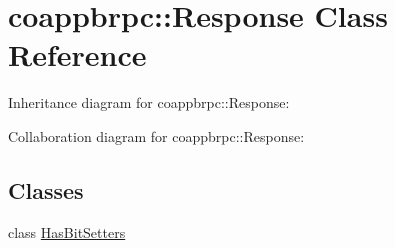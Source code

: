 \hypertarget{classcoappbrpc_1_1Response}{}\section{coappbrpc\+:\+:Response Class Reference}
\label{classcoappbrpc_1_1Response}


Inheritance diagram for coappbrpc\+:\+:Response\+:


Collaboration diagram for coappbrpc\+:\+:Response\+:
\subsection*{Classes}
\begin{DoxyCompactItemize}
\item 
class \hyperlink{classcoappbrpc_1_1Response_1_1HasBitSetters}{Has\+Bit\+Setters}
\end{DoxyCompactItemize}
